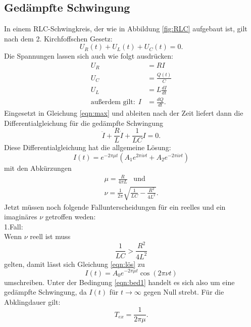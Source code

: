 \subsection{Gedämpfte Schwingung}
In einem RLC-Schwingkreis, der wie in Abbildung \ref{fig:RLC} aufgebaut ist, gilt nach dem
2. Kirchfoffschen Gesetz:
\begin{equation}
  U_{R}(t)+U_{L}(t)+U_{C}(t)=0.
  \label{eqn:max}
\end{equation}
Die Spannungen lassen sich auch wie folgt ausdrücken:
\begin{align}
  U_{R}&=RI\\
  U_{C}&=\frac{Q(t)}{C}\\
  U_{L}&=L\frac{dI}{dt}\\
\text{außerdem gilt:}\:\:I&=\frac{dQ}{dt}.
\end{align}
Eingesetzt in Gleichung \ref{eqn:max} und ableiten nach der Zeit liefert dann die Differentialgleichung
für die gedämpfte Schwingung
\begin{equation}
  \ddot{I}+\frac{R}{L}\dot{I}+\frac{1}{LC}I=0.
  \label{eqn:dgl}
\end{equation}
Diese Differentialgleichung hat die allgemeine Lösung:
\begin{equation}
  I(t)=e^{-2 \pi\mu t}(A_{1}e^{2 \pi i \nu t}+A_{2}e^{-2\pi i \nu t})
  \label{eqn:lös}
\end{equation}
mit den Abkürzungen
\begin{align*}
  \mu = \frac{R}{4\pi L} \;\;\; \text{und}\\
  \nu=\frac{1}{2\pi}\sqrt{\frac{1}{LC}-\frac{R^2}{4L^2}}.
\end{align*}
Jetzt müssen noch folgende Fallunterscheidungen für ein reelles und ein
imaginäres $\nu$ getroffen weden:\\
1.Fall:\\
Wenn $\nu$ reell ist muss
\begin{equation}
  \frac{1}{LC}>\frac{R^2}{4L^2}
  \label{eqn:bed1}
\end{equation}
gelten, damit lässt sich Gleichung \ref{eqn:lös} zu
\begin{equation}
  I(t)=A_{0}e^{-2\pi \mu t}\cos(2\pi \nu t )
\end{equation}
umschreiben. Unter der Bedingung \ref{eqn:bed1} handelt es sich also um
eine gedämpfte Schwingung, da $I(t)$ für $t \to \infty$ gegen Null strebt.
Für die Abklingdauer gilt:
\begin{equation}
  T_{ex}=\frac{1}{2\pi \mu}.
\end{equation}\\
